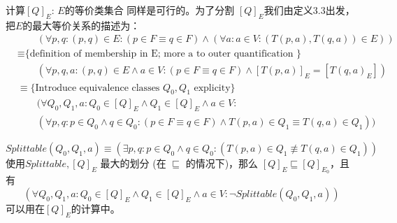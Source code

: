 计算$[Q]_E$: $E$的等价类集合 同样是可行的。为了分割 $[Q]_E$我们由定义3.3出发，把$E$的最大等价关系的描述为：
\begin{equation*}
    \begin{split}
        & \mbox{　　}(\forall p,q : (p,q) \in E : ( p \in F \equiv q \in F ) \land ( \forall a:a \in V : (T(p,a),T(q,a)) \in E )) \\
        & \equiv \mbox{\{ definition of membership in E; more a to outer quantification \} }\\
        & \mbox{　　}(\forall p,q,a:(p,q)\in E \land a\in V : (p \in F \equiv q \in F) \land [T(p,a)]_E = [T(q,a)_E]) \\
        & \equiv \mbox{\{ Introduce equivalence classes } Q_0,Q_1\mbox{ explicity\} } \\
        & \mbox{　　}(\forall Q_0,Q_1,a:Q_0\in [Q]_E \land Q_1 \in [Q]_E \land a \in V : \\
        & \mbox{　　}(\forall p,q:p\in Q_0 \land q\in Q_0 : (p \in F \equiv q \in F) \land T(p,a) \in Q_1 \equiv T(q,a) \in Q_1))
    \end{split}
\end{equation*}
\newline

$$ Splittable(Q_0,Q_1,a) \equiv (\exists p,q:p\in Q_0 \land q\in Q_0 : (T(p,a) \in Q_1 \not\equiv T(q,a) \in Q_1)) $$
使用$Splittable,[Q]_E$ 最大的划分 (在 $\sqsubseteq$ 的情况下)，那么 $[Q]_E \sqsubseteq [Q]_{E_0}$，且有
$$ (\forall Q_0,Q_1,a:Q_0 \in [Q]_E \land Q_1 \in [Q]_E \land a \in V : \neg Splittable(Q_0,Q_1,a)) $$
可以用在$[Q]_E$的计算中。